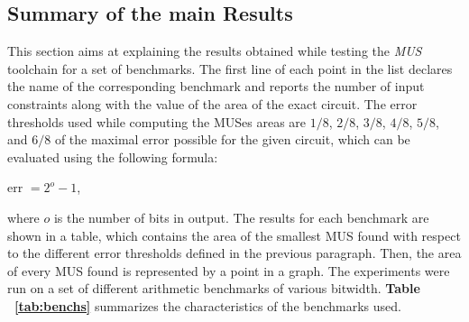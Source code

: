 \documentclass[]{usiinfbachelorproject}
\begin{document}
\subsection{Summary of the main Results}\label{subsec:summary}
This section aims at explaining the results obtained while testing the \textit{MUS} toolchain for a set of benchmarks. The first line of each point in the list declares the name of the corresponding benchmark and reports the number of input constraints along with the value of the area of the exact circuit. The error thresholds used while computing the MUSes areas are $1/8$, $2/8$, $3/8$, $4/8$, $5/8$, and $6/8$ of the maximal error possible for the given circuit, which can be evaluated using the following formula:
\begin{center}
    err $= 2^{o} - 1$,
\end{center}
where $o$ is the number of bits in output. The results for each benchmark are shown in a table, which contains the area of the smallest MUS found with respect to the different error thresholds defined in the previous paragraph. Then, the area of every MUS found is represented by a point in a graph. The experiments were run on a set of different arithmetic benchmarks of various bitwidth.
\textbf{Table ~\ref{tab:benchs}} summarizes the characteristics of the benchmarks used.
\end{document}
